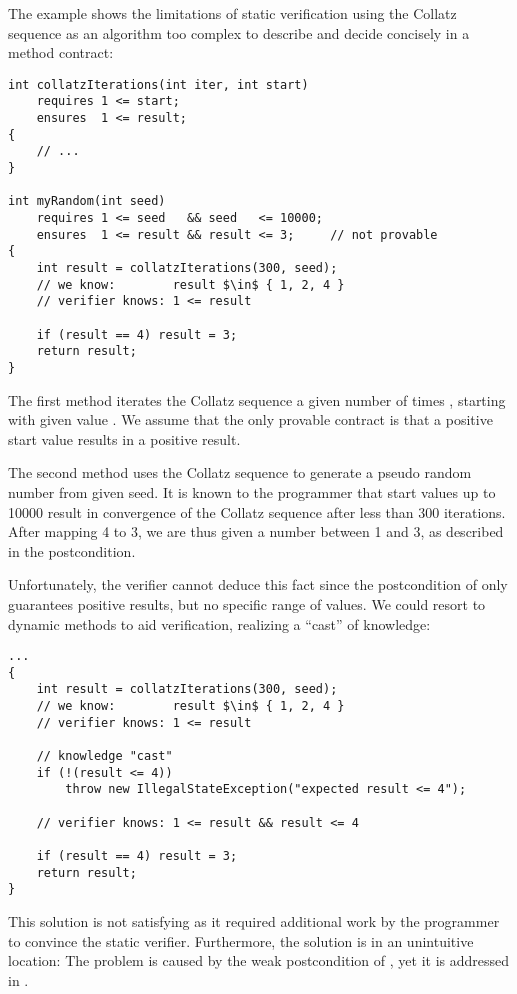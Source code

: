 The example shows the limitations of static verification using the Collatz sequence as an algorithm too complex to describe and decide concisely in a method contract:
\begin{lstlisting}
int collatzIterations(int iter, int start)
    requires 1 <= start;
    ensures  1 <= result;
{
    // ...
}

int myRandom(int seed)
    requires 1 <= seed   && seed   <= 10000;
    ensures  1 <= result && result <= 3;     // not provable
{
    int result = collatzIterations(300, seed);
    // we know:        result $\in$ { 1, 2, 4 }
    // verifier knows: 1 <= result
    
    if (result == 4) result = 3;
    return result;
}
\end{lstlisting}
The first method  iterates the Collatz sequence a given number of times , starting with given value .
We assume that the only provable contract is that a positive start value results in a positive result.

The second method  uses the Collatz sequence to generate a pseudo random number from given seed.
It is known to the programmer that start values up to 10000 result in convergence of the Collatz sequence after less than 300 iterations.
After mapping 4 to 3, we are thus given a number between 1 and 3, as described in the postcondition.

Unfortunately, the verifier cannot deduce this fact since the postcondition of  only guarantees positive results, but no specific range of values.
We could resort to dynamic methods to aid verification, realizing a “cast” of knowledge:
\pagebreak
\begin{lstlisting}
...
{
    int result = collatzIterations(300, seed);
    // we know:        result $\in$ { 1, 2, 4 }
    // verifier knows: 1 <= result
    
    // knowledge "cast"
    if (!(result <= 4))
        throw new IllegalStateException("expected result <= 4");

    // verifier knows: 1 <= result && result <= 4 
    
    if (result == 4) result = 3;
    return result;
}
\end{lstlisting}

This solution is not satisfying as it required additional work by the programmer to convince the static verifier.
Furthermore, the solution is in an unintuitive location:
The problem is caused by the weak postcondition of , yet it is addressed in .

